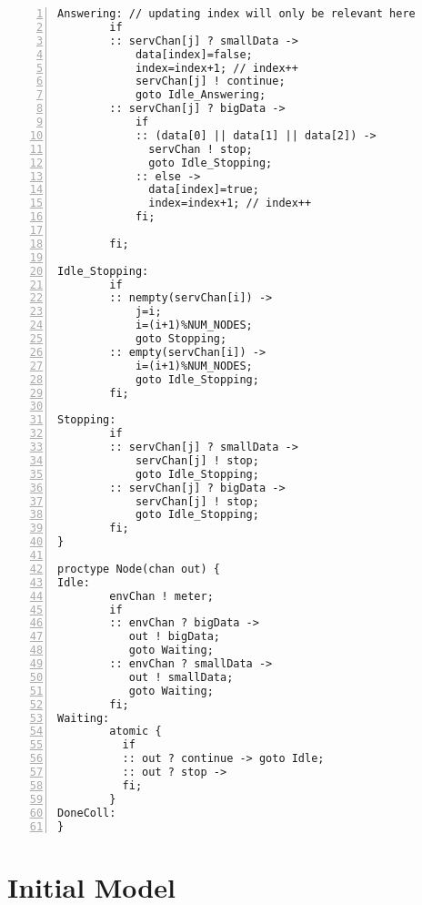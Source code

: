 \begin{lstlisting}[caption=centralized\_conjunctive\_centralized.pml,language=Promela, numbers=left, basicstyle=\footnotesize, tabsize=2]
Answering: // updating index will only be relevant here
        if
        :: servChan[j] ? smallData -> 
            data[index]=false;
            index=index+1; // index++
            servChan[j] ! continue; 
            goto Idle_Answering;
        :: servChan[j] ? bigData ->
            if 
            :: (data[0] || data[1] || data[2]) -> 
              servChan ! stop;
              goto Idle_Stopping;
            :: else -> 
              data[index]=true;
              index=index+1; // index++
            fi;

        fi;
        
Idle_Stopping:
        if
        :: nempty(servChan[i]) -> 
            j=i;
            i=(i+1)%NUM_NODES;
            goto Stopping; 
        :: empty(servChan[i]) ->
            i=(i+1)%NUM_NODES;
            goto Idle_Stopping;
        fi;

Stopping:    
        if
        :: servChan[j] ? smallData -> 
            servChan[j] ! stop; 
            goto Idle_Stopping;
        :: servChan[j] ? bigData ->
            servChan[j] ! stop;
            goto Idle_Stopping;
        fi;
}

proctype Node(chan out) {
Idle:   
        envChan ! meter; 
        if
        :: envChan ? bigData -> 
           out ! bigData; 
           goto Waiting;
        :: envChan ? smallData -> 
           out ! smallData; 
           goto Waiting;
        fi;
Waiting:
        atomic {
          if
          :: out ? continue -> goto Idle;
          :: out ? stop -> 
          fi;
        }
DoneColl: 
}
\end{lstlisting}

\section{Initial Model} \label{oldmodel}

